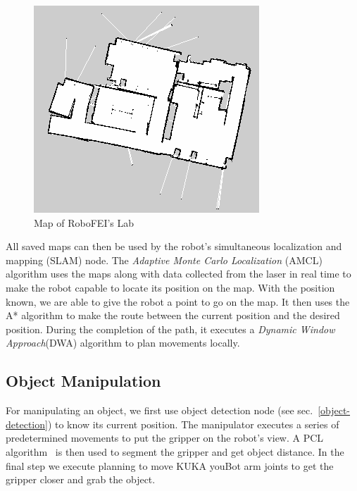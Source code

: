 \begin{figure}[ht!]
    \centering
    \includegraphics[scale=0.6]{figures/map.png}
    \caption{Map of RoboFEI's Lab}
    \label{fig:map}
\end{figure}

All saved maps can then be used by the robot's simultaneous localization and mapping (SLAM) node. The \emph{Adaptive Monte Carlo Localization} (AMCL) algorithm \cite{fox:1999} uses the maps along with data collected from the laser in real time to make the robot capable to locate its position on the map. With the position known, we are able to give the robot a point to go on the map. It then uses the A* algorithm to make the route between the current position and the desired position. During the completion of the path, it executes a \emph{Dynamic Window Approach}(DWA) algorithm to plan movements locally.

\subsection{Object Manipulation}\label{manipulation}
For manipulating an object, we first use object detection node (see sec.~\ref{object-detection}) to know its current position. The manipulator executes a series of predetermined movements to put the gripper on the robot's view. A PCL algorithm~\cite{aldoma:2012} is then used to segment the gripper and get object distance. In the final step we execute planning to move KUKA youBot arm joints to get the gripper closer and grab the object.
